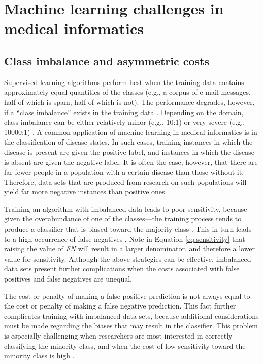 \documentclass[12pt]{article} %
\begin{document}
\section{Machine learning challenges in medical informatics}
\subsection{Class imbalance and asymmetric costs}
Supervised learning algorithms perform best when the training data contains approximately equal quantities of the classes (e.g., a corpus of e-mail messages, half of which is spam, half of which is not). The performance degrades, however, if a ``class imbalance'' exists in the training data \cite{guo2008, he2009}. Depending on the domain, class imbalance can be either relatively minor (e.g., 10:1) or very severe (e.g., 10000:1) \cite{he2009}. A common application of machine learning in medical informatics is in the classification of disease states. In such cases, training instances in which the disease is present are given the positive label, and instances in which the disease is absent are given the negative label. It is often the case, however, that there are far fewer people in a population with a certain disease than those without it. Therefore, data sets that are produced from research on such populations will yield far more negative instances than positive ones.

Training an algorithm with imbalanced data leads to poor sensitivity, because---given the overabundance of one of the classes---the training process tends to produce a classifier that is biased toward the majority class \cite{guo2008}. This in turn leads to a high occurrence of false negatives \cite{wallace2012}. Note in Equation \ref{eq:sensitivity} that raising the value of \textit{FN} will result in a larger denominator, and therefore a lower value for sensitivity. Although the above strategies can be effective, imbalanced data sets present further complications when the costs associated with false positives and false negatives are unequal.

The cost or penalty of making a false positive prediction is not always equal to the cost or penalty of making a false negative prediction.
This fact further complicates training with imbalanced data sets, because additional considerations must be made regarding the biases that may result in the classifier.
This problem is especially challenging when researchers are most interested in correctly classifying the minority class, and when the cost of low sensitivity toward the minority class is high \cite{wallace2012}.
\end{document}
